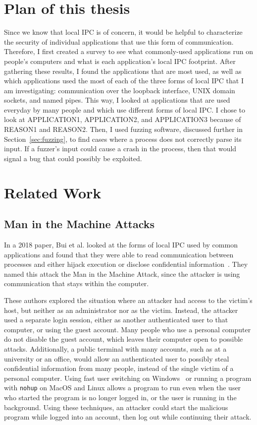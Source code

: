 \section{Plan of this thesis}
\label{sec:planOfThesis}
Since we know that local IPC is of concern, it would be helpful to characterize the security of individual applications that use this form of communication.  Therefore, I first created a survey to see what commonly-used applications run on people's computers and what is each application's local IPC footprint.  After gathering these results, I found the applications that are most used, as well as which applications used the most of each of the three forms of local IPC that I am investigating: communication over the loopback interface, UNIX domain sockets, and named pipes.  This way, I looked at applications that are used everyday by many people and which use different forms of local IPC.  I chose to look at APPLICATION1, APPLICATION2, and APPLICATION3 because of REASON1 and REASON2.  Then, I used fuzzing software, discussed further in Section~\ref{sec:fuzzing}, to find cases where a process does not correctly parse its input.  If a fuzzer's input could cause a crash in the process, then that would signal a bug that could possibly be exploited.


\section{Related Work}
\label{sec:relatedWork}
\subsection{Man in the Machine Attacks}
\label{sec:manInMachineAttack}
In a 2018 paper, Bui et al. looked at the forms of local IPC used by common applications and found that they were able to read communication between processes and either hijack execution or disclose confidential information~\cite{MitMa}.  They named this attack the Man in the Machine Attack, since the attacker is using communication that stays within the computer.

These authors explored the situation where an attacker had access to the victim's host, but neither as an administrator nor as the victim.  Instead, the attacker used a separate login session, either as another authenticated user to that computer, or using the guest account.  Many people who use a personal computer do not disable the guest account, which leaves their computer open to possible attacks.  Additionally, a public terminal with many accounts, such as at a university or an office, would allow an authenticated user to possibly steal confidential information from many people, instead of the single victim of a personal computer.  Using fast user switching on Windows~\cite{microsoft_developers_network_2018} or running a program with \texttt{nohup} on MacOS and Linux allows a program to run even when the user who started the program is no longer logged in, or the user is running in the background.  Using these techniques, an attacker could start the malicious program while logged into an account, then log out while continuing their attack.

